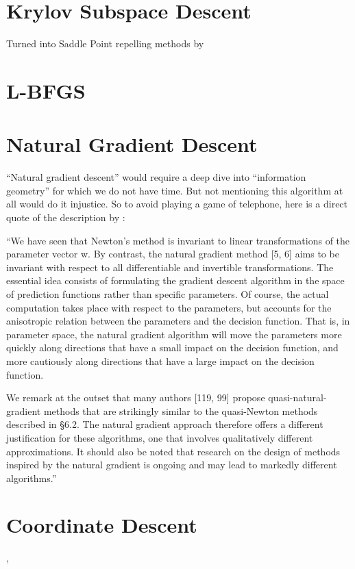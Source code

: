 \section{Krylov Subspace Descent}

\textcite{vinyalsKrylovSubspaceDescent2012}

Turned into Saddle Point repelling methods by \textcite{dauphinIdentifyingAttackingSaddle2014}


\section{L-BFGS}



\section{Natural Gradient Descent}

``Natural gradient descent'' would require a deep dive into ``information geometry''
for which we do not have time. But not mentioning this algorithm at all would do it
injustice. So to avoid playing a game of telephone, here is a direct quote of
the description by \textcite{bottouOptimizationMethodsLargeScale2018}:

``We have seen that Newton's method is invariant to linear transformations of
the parameter vector w. By contrast, the natural gradient method [5, 6] aims to
be invariant with respect to all differentiable and invertible transformations.
The essential idea consists of formulating the gradient descent algorithm in the
space of prediction functions rather than specific parameters. Of course, the
actual computation takes place with respect to the parameters, but accounts for
the anisotropic relation between the parameters and the decision function. That
is, in parameter space, the natural gradient algorithm will move the parameters
more quickly along directions that have a small impact on the decision function,
and more cautiously along directions that have a large impact on the decision
function.

We remark at the outset that many authors [119, 99] propose
quasi-natural-gradient methods that are strikingly similar to the quasi-Newton
methods described in §6.2. The natural gradient approach therefore offers a
different justification for these algorithms, one that involves qualitatively
different approximations. It should also be noted that research on the design of
methods inspired by the natural gradient is ongoing and may lead to markedly
different algorithms.''

\section{Coordinate Descent}

\textcite[7.3]{bottouOptimizationMethodsLargeScale2018}, \textcite[6.4]{bubeckConvexOptimizationAlgorithms2015}



\endinput
